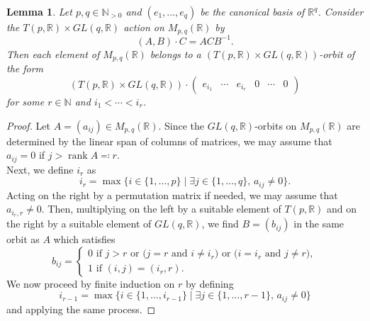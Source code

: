 \documentclass[pdftex]{sigma}
\numberwithin{equation}{section}
\newtheorem{Lemma}[Theorem]{Lemma}
\theoremstyle{definition}
\newcommand{\rank}{\operatorname{rank}}
\newcommand{\R}{\mathbb{R}}
\newcommand{\N}{\mathbb{N}}
\theoremstyle{plain}
\theoremstyle{plain}
\theoremstyle{plain}
\theoremstyle{plain}
\begin{document}
\begin{Lemma}{\label{lemme_fondamental}}
	Let $p,q \in \N_{>0}$ and $(e_1,\dots,e_q)$ be the canonical basis of $\R^q$. Consider the $T(p,\R) \times GL(q,\R)$ action on $M_{p,q}(\R)$ by
	\begin{equation*}
		(A,B)\cdot C = ACB^{-1}.
	\end{equation*}
	Then each element of $M_{p,q}(\R)$ belongs to a $(T(p,\R) \times GL(q,\R))$-orbit of the form
	\begin{equation*}
		(T(p,\R) \times GL(q,\R)) \cdot \begin{pmatrix}
		e_{i_1} & \cdots & e_{i_r} & 0 & \cdots & 0
	\end{pmatrix}
	\end{equation*}
	for some $r \in \N$ and $i_1 < \cdots < i_r$.
\end{Lemma}
\begin{proof}
	Let $A = (a_{ij}) \in M_{p,q}(\R)$. Since the $GL(q,\R)$-orbits on $M_{p,q}(\R)$ are determined by the linear span of columns of matrices, we may assume that $a_{ij} = 0$ if $j > \rank A \eqcolon r$.\\
	Next, we define $i_r$ as
	\begin{equation*}
		i_r = \max\{i \in \{1,\dots,p\} \mid \exists j \in \{1,\dots, q\}, \,  a_{ij} \neq 0\}.
	\end{equation*}
	Acting on the right by a permutation matrix if needed, we may assume that $a_{i_r,r} \neq 0$.
	Then, multiplying on the left by a suitable element of $T(p,\R)$ and on the right by a suitable element of $GL(q,\R)$, we find $B = (b_{ij})$ in the same orbit as $A$  which satisfies
	\begin{equation*}
		b_{ij} = \begin{cases}
		0 \text{ if }j > r \text{ or } \Big(j = r \text{ and } i \neq i_r \Big) \text{ or } \Big( i = i_r \text{ and } j \neq r \Big),\\
		1 \text{ if } (i,j) = (i_r,r).
	\end{cases}
	\end{equation*}
	We now proceed by finite induction on $r$ by defining 
	\begin{equation*}
		i_{r-1} = \max\{i \in \{1,\dots,i_{r-1}\} \mid \exists j \in \{1,\dots, r-1\}, \,  a_{ij} \neq 0\}
	\end{equation*}
	and applying the same process.
\end{proof}
\end{document}
